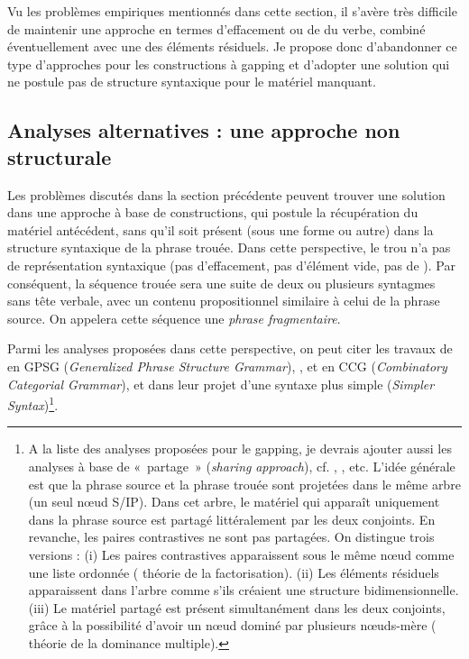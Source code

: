 Vu les problèmes empiriques mentionnés dans cette section, il s’avère très difficile de maintenir une approche en termes d’effacement ou de  du verbe, combiné éventuellement avec une  des éléments résiduels. Je propose donc d’abandonner ce type d’approches pour les constructions à gapping et d’adopter une solution qui ne postule pas de structure syntaxique pour le matériel manquant. 


\subsection{Analyses alternatives : une {approche non structurale}} \label{ch2:sect2.4.4}

Les problèmes discutés dans la section précédente peuvent trouver une solution dans une approche à base de constructions, qui postule la récupération du matériel antécédent, sans qu’il soit présent (sous une forme ou autre) dans la structure syntaxique de la phrase trouée. Dans cette perspective, le trou n’a pas de représentation syntaxique (pas d’effacement, pas d’élément vide, pas de ). Par conséquent, la séquence trouée sera une suite de deux ou plusieurs syntagmes sans tête verbale, avec un contenu propositionnel similaire à celui de la phrase source. On appelera cette séquence une \textit{phrase fragmentaire}.

Parmi les analyses proposées dans cette perspective, on peut citer les travaux de \citet{SagEtAl1985} en GPSG (\textit{Generalized Phrase Structure Grammar}), \citet{Steedman1990,Steedman2000}, \citet{Gardent1991} et \citet{Hoyt2008} en CCG (\textit{Combinatory Categorial Grammar}), \citet{CulicoverEtAl2005} et \citet{Culicover2009} dans leur projet d’une syntaxe plus simple (\textit{Simpler Syntax})\footnote{
 A la liste des analyses proposées pour le gapping, je devrais ajouter aussi les analyses à base de «~partage~» (\textit{sharing} \textit{approach}), cf. \citet{Goodall1987}, \citet{Moltmann1992}, etc. L’idée générale est que la phrase source et la phrase trouée sont projetées dans le même arbre (un seul nœud S/IP). Dans cet arbre, le matériel qui apparaît uniquement dans la phrase source est partagé littéralement par les deux conjoints. En revanche, les paires contrastives ne sont pas partagées. On distingue trois versions : (i) Les paires contrastives apparaissent sous le même nœud comme une liste ordonnée ({\cad} théorie de la factorisation). (ii) Les éléments résiduels apparaissent dans l’arbre comme s’ils créaient une structure bidimensionnelle. (iii) Le matériel partagé est présent simultanément dans les deux conjoints, grâce à la possibilité d’avoir un nœud dominé par plusieurs nœuds-mère ({\cad} théorie de la dominance multiple).}. 


